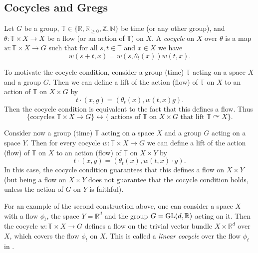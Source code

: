\documentclass{report}
\begin{document}
\subsection{Cocycles and Gregs}
\begin{definition}
    Let $G$ be a group, $\mathbb T \in \{\mathbb R, \mathbb R_{\geq 0}, \mathbb Z, \mathbb N\}$ be time (or any other group), and $\theta: \mathbb T \times X \to X$ be a flow (or an action of $\mathbb T$) on $X$.
        A \emph{cocycle} on $X$ over $\theta$ is a map $w: \mathbb T \times X \to G$ such that for all $s, t \in \mathbb T$ and $x \in X$ we have
        \[
        w(s+t, x) = w(s, \theta_t(x)) w(t, x).
        \]
\end{definition}
\begin{remark}
    To motivate the cocycle condition, consider a group (time) $\mathbb T$ acting on a space $X$ and a group $G$.
    Then we can define a lift of the action (flow) of $\mathbb T$ on $X$ to an action of $\mathbb T$ on $X \times G$ by
    \[
    t \cdot (x, g) = (\theta_t(x), w(t,x) g).
    \]
    Then the cocycle condition is equivalent to the fact that this defines a flow.
    Thus
    \[
    \{\text{cocycles } \mathbb T \times X \to G\} \leftrightarrow \{ \text{ actions of } \mathbb T \text{ on } X \times G \text{ that lift } \mathbb T \curvearrowright X\}.
    \]

    Consider now a group (time) $\mathbb T$ acting on a space $X$ and a group $G$ acting on a space $Y$.
    Then for every cocycle $w: \mathbb T \times X \to G$ we can define a lift of the action (flow) of $\mathbb T$ on $X$ to an action (flow) of $\mathbb T$ on $X \times Y$ by
    \[
    t \cdot (x, y) = (\theta_t(x), w(t,x) \cdot y).
    \]
    In this case, the cocycle condition guarantees that this defines a flow on $X \times Y$ (but being a flow on $X \times Y$ does not guarantee that the cocycle condition holds, unless the action of $G$ on $Y$ is faithful).
\end{remark}
\begin{example}
    For an example of the second construction above, one can consider a space $X$ with a flow $\phi_t$, the space $Y = \mathbb R^d$ and the group $G = \operatorname{{\mathrm{GL}}}(d, \mathbb R)$ acting on it.
    Then the cocycle $w: \mathbb T \times X \to G$ defines a flow on the trivial vector bundle $X \times \mathbb R^d$ over $X$, which covers the flow $\phi_t$ on $X$.
    This is called a \emph{linear cocycle} over the flow $\phi_t$ in \cite{bochi2019anosov}.
\end{example}
\end{document}
